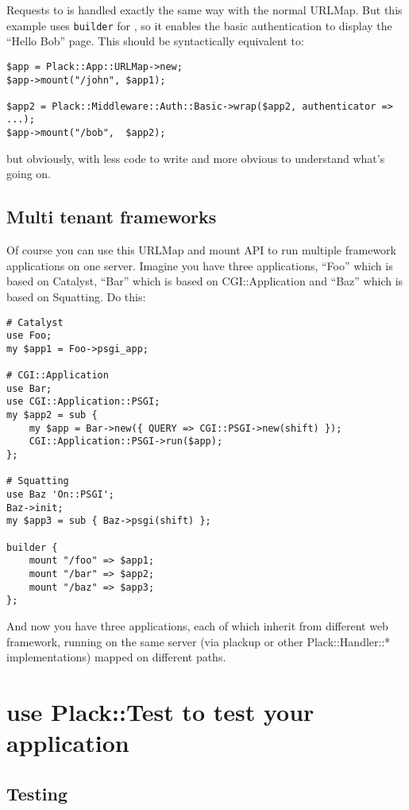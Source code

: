 Requests to  is handled exactly the same way with the normal
URLMap. But this example uses \lstinline!builder! for , so it
enables the basic authentication to display the ``Hello Bob'' page. This
should be syntactically equivalent to:

\begin{lstlisting}
$app = Plack::App::URLMap->new;
$app->mount("/john", $app1);

$app2 = Plack::Middleware::Auth::Basic->wrap($app2, authenticator => ...);
$app->mount("/bob",  $app2);
\end{lstlisting}

but obviously, with less code to write and more obvious to understand
what's going on.

\section{Multi tenant frameworks}\label{multi-tenant-frameworks}

Of course you can use this URLMap and mount API to run multiple
framework applications on one server. Imagine you have three
applications, ``Foo'' which is based on Catalyst, ``Bar'' which is based
on CGI::Application and ``Baz'' which is based on Squatting. Do this:

\begin{lstlisting}
# Catalyst
use Foo;
my $app1 = Foo->psgi_app;

# CGI::Application
use Bar;
use CGI::Application::PSGI;
my $app2 = sub { 
    my $app = Bar->new({ QUERY => CGI::PSGI->new(shift) });
    CGI::Application::PSGI->run($app);
};

# Squatting
use Baz 'On::PSGI';
Baz->init;
my $app3 = sub { Baz->psgi(shift) };

builder {
    mount "/foo" => $app1;
    mount "/bar" => $app2;
    mount "/baz" => $app3;
};
\end{lstlisting}

And now you have three applications, each of which inherit from
different web framework, running on the same server (via plackup or
other Plack::Handler::* implementations) mapped on different paths.

\chapter{use Plack::Test to test your
application}\label{day-13-use-placktest-to-test-your-application}

\section{Testing}\label{testing}

